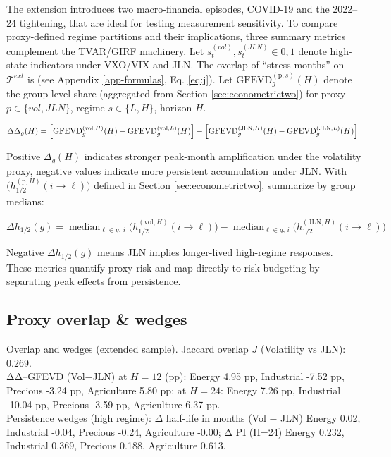 \documentclass[
  11pt,
]{article}
\begin{document}
The extension introduces two macro-financial episodes, COVID-19 and the 2022--24 tightening, that are ideal for testing measurement sensitivity. To compare proxy-defined regime partitions and their implications, three summary metrics complement the TVAR/GIRF machinery.
Let \(s_t^{(vol)}, s_t^{(JLN)} \in {{0,1}}\) denote high-state indicators under VXO/VIX and JLN. The overlap of ``stress months'' on \(\mathcal{T}^{ext}\) is (see Appendix \ref{app-formulas}, Eq. \eqref{eq:j}). Let \(\mathrm{GFEVD}_g^{(\mathrm{p},s)}(H)\) denote the group-level share (aggregated from Section \ref{sec:econometrictwo}) for proxy \(p \in \{vol, JLN\}\), regime \(s \in \{L, H\}\), horizon \(H\).

\begin{equation}\label{eq:delta-gh}
\Delta\Delta_g(H)
=
\Bigl[
\mathrm{GFEVD}_g^{(\mathrm{vol},H)}(H)
-
\mathrm{GFEVD}_g^{(\mathrm{vol},L)}(H)
\Bigr]
-
\Bigl[
\mathrm{GFEVD}_g^{(\mathrm{JLN},H)}(H)
-
\mathrm{GFEVD}_g^{(\mathrm{JLN},L)}(H)
\Bigr].
\end{equation}

Positive \(\Delta_g(H)\) indicates stronger peak-month amplification under the volatility proxy, negative values indicate more persistent accumulation under JLN. With \(\big( h_{1/2}^{(\mathrm{p},H)}(i \to \ell) \big)\) defined in Section \ref{sec:econometrictwo}, summarize by group medians:

\begin{equation}\label{eq:delta-h}
\Delta h_{1/2}(g)
=
\operatorname{median}_{\ell \in g,\, i}
\big( h_{1/2}^{(\mathrm{vol},H)}(i \to \ell) \big)
-
\operatorname{median}_{\ell \in g,\, i}
\big( h_{1/2}^{(\mathrm{JLN},H)}(i \to \ell) \big)
\end{equation}

Negative \(\Delta h_{1/2}(g)\) means JLN implies longer-lived high-regime responses. These metrics quantify proxy risk and map directly to risk-budgeting by separating peak effects from persistence.

\subsection{Proxy overlap \& wedges}\label{sec:extensiontwo}

Overlap and wedges (extended sample).
Jaccard overlap \(J\) (Volatility vs JLN): 0.269.\\
ΔΔ--GFEVD (Vol−JLN) at \(H=12\) (pp): Energy 4.95 pp, Industrial -7.52 pp, Precious -3.24 pp, Agriculture 5.80 pp; at \(H=24\): Energy 7.26 pp, Industrial -10.04 pp, Precious -3.59 pp, Agriculture 6.37 pp.\\
Persistence wedges (high regime): \(\Delta\) half-life in months (Vol − JLN) Energy 0.02, Industrial -0.04, Precious -0.24, Agriculture -0.00; Δ PI (H=24) Energy 0.232, Industrial 0.369, Precious 0.188, Agriculture 0.613.
\end{document}
